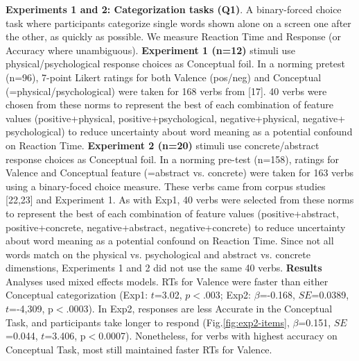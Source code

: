 \noindent \textbf{Experiments 1 and 2: Categorization tasks (Q1)}. A binary-forced choice task where participants categorize single words shown alone on a screen one after the other, as quickly as possible. We measure Reaction Time and Response (or Accuracy where unambiguous). \textbf{Experiment 1 (n=12)} stimuli use physical/psychological response choices as Conceptual foil. In a norming pretest (n=96), 7-point Likert ratings for both Valence (pos/neg) and Conceptual (=physical/psychological) were taken for 168 verbs from [17]. 40 verbs were chosen from these norms to represent the best of each combination of feature values (positive+physical, positive+psychological, negative+physical, negative+ psychological) to reduce uncertainty about word meaning as a potential confound on Reaction Time. \textbf{Experiment 2 (n=20)} stimuli use concrete/abstract response choices as Conceptual foil. In a norming pre-test (n=158), ratings for Valence and Conceptual feature (=abstract vs. concrete) were taken for 163 verbs using a binary-foced choice measure. These verbs came from corpus studies [22,23] and Experiment 1. As with Exp1, 40 verbs were selected from these norms to represent the best of each combination of feature values (positive+abstract, positive+concrete, negative+abstract, negative+concrete) to reduce uncertainty about word meaning as a potential confound on Reaction Time. Since not all words match on the physical vs. psychological and abstract vs. concrete dimenstions, Experiments 1 and 2 did not use the same 40 verbs. \textbf{Results} Analyses used mixed effects models. RTs for Valence were faster than either Conceptual categorization (Exp1: $t$=3.02, $p<$.003; Exp2: $\beta$=-0.168, $SE$=0.0389, $t$=-4,309, p$<$.0003). In Exp2, responses are less Accurate in the Conceptual Task, and participants take longer to respond (Fig.\ref{fig:exp2-items}, $\beta$=0.151, $SE$=0.044, $t$=3.406, p$<$0.0007). Nonetheless, for verbs with highest accuracy on Conceptual Task, most still maintained faster RTs for Valence.\\

